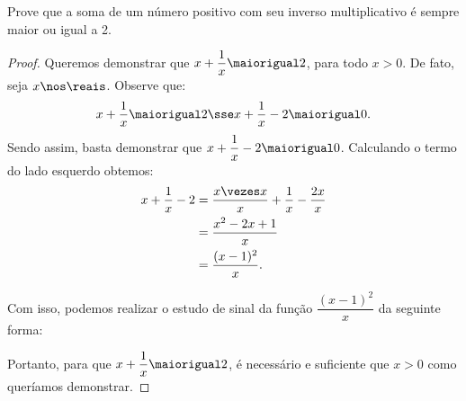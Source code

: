 \begin{example}
    Prove que a soma de um número positivo com seu inverso multiplicativo é sempre maior ou igual a 2.
\end{example}

\begin{proof}
    Queremos demonstrar que $x + \dfrac 1 x \maiorigual 2$, para todo $x > 0$. De fato, seja $x \nos \reais$. Observe que:
    \[
        x + \dfrac 1 x \maiorigual 2 \sse x + \dfrac 1 x - 2 \maiorigual 0.
    \]
    Sendo assim, basta demonstrar que $x + \dfrac 1 x - 2 \maiorigual 0$. Calculando o termo do lado esquerdo obtemos:
    \begin{align*}
        x + \dfrac 1 x - 2 &= \dfrac {x \vezes x} x + \dfrac 1 x -  \dfrac {2x} x \\
                           &= \dfrac {x^2 - 2x + 1} x \\
                           &= \dfrac {(x - 1)^2} x.
    \end{align*}

    Com isso, podemos realizar o estudo de sinal da função $\dfrac {(x - 1)^2} x$ da seguinte forma:
    \begin{figure}[H]
        \centering
        \caption{}
    \end{figure}

    Portanto, para que $x + \dfrac 1 x \maiorigual 2$, é necessário e suficiente que $x > 0$ como queríamos demonstrar.
\end{proof}